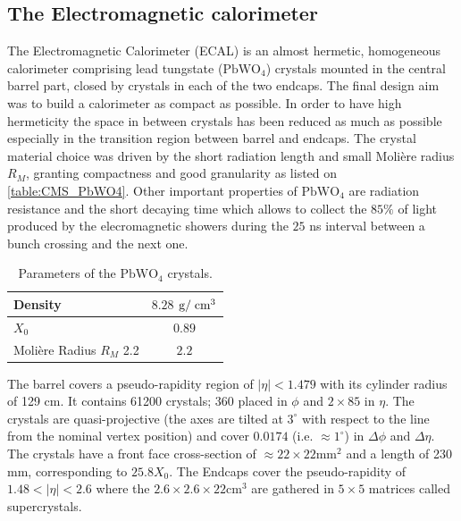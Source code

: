 \subsection{The Electromagnetic calorimeter}

The Electromagnetic Calorimeter (ECAL) is an almost hermetic, homogeneous calorimeter comprising lead tungstate ($\text{PbWO}_{4}$) crystals mounted in the central barrel part, closed by crystals in each of the two endcaps. The final design aim was to build a calorimeter as compact as possible. In order to have high hermeticity the space in between crystals has been reduced as much as possible especially in the transition region between barrel and endcaps. 
The crystal material choice was driven by the short radiation length and small Moli\`{e}re radius $R_{M}$, granting compactness and good granularity as listed on \autoref{table:CMS_PbWO4}. Other important properties of  $\text{PbWO}_{4}$ are radiation resistance and the short decaying time which allows to collect the $85\%$ of light produced by the elecromagnetic showers during the $25$ ns interval between a bunch crossing and the next one.

\begin{table}[tbh!]
	\begin{center}
		
		\begin{tabular}{ | l | c |}
			\hline
			Density  & $ 8.28$ $\text{g} /\;\text{cm}^{3}$ \\ \hline
			$X_{0}$   & $0.89$ \cm \\ \hline
			Moli\`{e}re Radius $R_{M}$ 2.2 & $2.2$ \cm  \\ \hline
		\end{tabular}
		\caption{Parameters of the $\text{PbWO}_{4}$ crystals.}
		\label{table:CMS_PbWO4}
	\end{center}
\end{table}

The barrel covers a pseudo-rapidity region of $|\eta| < 1.479$ with its cylinder radius of 129 cm. It contains 61200 crystals; 360 placed in $\phi$ and $2\times85$ in $\eta$. The crystals are quasi-projective (the axes are tilted at $3^{\circ}$ with respect to the line from the nominal vertex position) and cover $0.0174$ (i.e. $\approx1^{\circ}$) in $\Delta\phi$ and $\Delta\eta$. The crystals have a front face cross-section of $\approx 22\times 22 \text{mm}^{2}$ and a length of 230 mm, corresponding to $25.8 X_{0}$. The Endcaps cover the pseudo-rapidity of $1.48 < |\eta| < 2.6$ where the $2.6\times2.6\times22 \text{cm}^{3}$ are gathered in $5\times5$ matrices called supercrystals.

